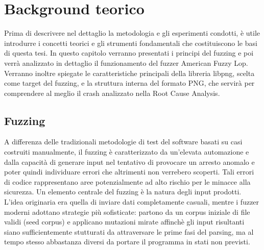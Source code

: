 \chapter{Background teorico}
Prima di descrivere nel dettaglio la metodologia e gli esperimenti condotti, è utile introdurre i concetti teorici e gli strumenti fondamentali che costituiscono le basi di questa tesi.
In questo capitolo verranno presentati i principi del fuzzing e poi verrà analizzato in dettaglio il funzionamento del fuzzer American Fuzzy Lop.
Verranno inoltre spiegate le caratteristiche principali della libreria libpng, scelta come target del fuzzing, e la struttura interna del formato PNG, che servirà per comprendere al meglio il crash analizzato nella Root Cause Analysis.  

\section{Fuzzing}
A differenza delle tradizionali metodologie di test del software basati su casi costruiti manualmente, il fuzzing è caratterizzato da un'elevata automazione e dalla capacità di generare input nel tentativo di provocare un arresto anomalo e poter quindi individuare errori che altrimenti non verrebero scoperti.
Tali errori di codice rappresentano aree potenzialmente ad alto rischio per le minacce alla sicurezza.
Un elemento centrale del fuzzing è la natura degli input prodotti.
L'idea originaria era quella di inviare dati completamente casuali, mentre i fuzzer moderni adottano strategie più sofisticate: partono da un corpus iniziale di file validi (seed corpus) e applicano mutazioni mirate affinchè gli input risultanti siano sufficientemente stutturati da attraversare le prime fasi del parsing, ma al tempo stesso abbastanza diversi da portare il programma in stati non previsti.

